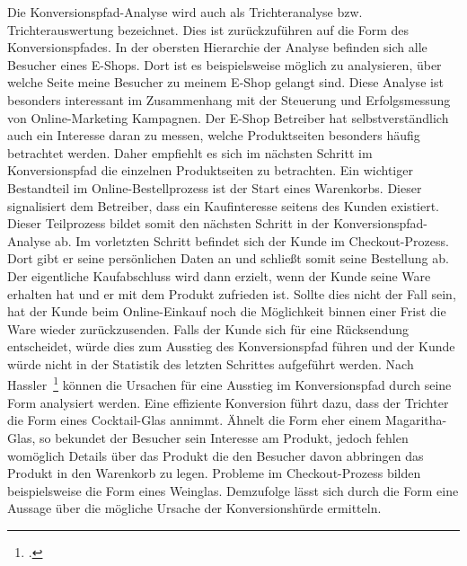 Die Konversionspfad-Analyse wird auch als Trichteranalyse bzw. Trichterauswertung bezeichnet. Dies ist zurückzuführen auf die Form des Konversionspfades. In der obersten Hierarchie der Analyse befinden sich alle Besucher eines E-Shops. Dort ist es beispielsweise möglich zu analysieren, über welche Seite meine Besucher zu meinem E-Shop gelangt sind. Diese Analyse ist besonders interessant im Zusammenhang mit der Steuerung und Erfolgsmessung von Online-Marketing Kampagnen. Der E-Shop Betreiber hat selbstverständlich auch ein Interesse daran zu messen, welche Produktseiten besonders häufig betrachtet werden. Daher empfiehlt es sich im nächsten Schritt im Konversionspfad die einzelnen Produktseiten zu betrachten. Ein wichtiger Bestandteil im Online-Bestellprozess ist der Start eines Warenkorbs. Dieser signalisiert dem Betreiber, dass ein Kaufinteresse seitens des Kunden existiert. Dieser Teilprozess bildet somit den nächsten Schritt in der Konversionspfad-Analyse ab. Im vorletzten Schritt befindet sich der Kunde im Checkout-Prozess. Dort gibt er seine persönlichen Daten an und schließt somit seine Bestellung ab. Der eigentliche Kaufabschluss wird dann erzielt, wenn der Kunde seine Ware erhalten hat und er mit dem Produkt zufrieden ist. Sollte dies nicht der Fall sein, hat der Kunde beim Online-Einkauf noch die Möglichkeit binnen einer Frist die Ware wieder zurückzusenden. Falls der Kunde sich für eine Rücksendung entscheidet, würde dies zum Ausstieg des Konversionspfad führen und der Kunde würde nicht in der Statistik des letzten Schrittes aufgeführt werden. Nach Hassler~\footcite[Vgl. ][Seite 380-381]{Hassler.2010} können die Ursachen für eine Ausstieg im Konversionspfad durch seine Form analysiert werden. Eine effiziente Konversion führt dazu, dass der Trichter die Form eines Cocktail-Glas annimmt. Ähnelt die Form eher einem Magaritha-Glas, so bekundet der Besucher sein Interesse am Produkt, jedoch fehlen womöglich Details über das Produkt die den Besucher davon abbringen das Produkt in den Warenkorb zu legen. Probleme im Checkout-Prozess bilden beispielsweise die Form eines Weinglas. Demzufolge lässt sich durch die Form eine Aussage über die mögliche Ursache der Konversionshürde ermitteln.

